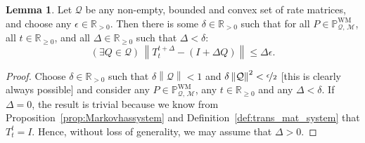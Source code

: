 \documentclass[10pt,a4paper]{paper}
\theoremstyle{definition}
\newtheorem{lemma}[theorem]{Lemma}
\newcommand{\reals}{\mathbb{R}}
\newcommand{\realspos}{\reals_{>0}}
\newcommand{\realsnonneg}{\reals_{\geq 0}}
\newcommand{\processes}{\mathbb{P}}
\newcommand{\wmprocesses}{\processes^{\mathrm{WM}}}
\newcommand{\rateset}{\mathcal{Q}}
\newcommand{\norm}[1]{\left\lVert #1 \right\rVert}
\begin{document}
\begin{lemma}\label{lemma:uniform_delta_for_convex_markov_set}
Let $\rateset$ be any non-empty, bounded and convex set of rate matrices, and choose any $\epsilon\in\realspos$. Then there is some $\delta\in\realspos$ such that for all $P\in\wmprocesses_{\rateset,\,\mathcal{M}}$, all $t\in\realsnonneg$, and all $\Delta\in\realsnonneg$ such that $\Delta<\delta$:
\begin{equation*}
(\exists Q\in\rateset)\,\norm{T_{t}^{t+\Delta} - (I+\Delta Q)} \leq \Delta\epsilon.
\end{equation*}
\end{lemma}
\begin{proof}
Choose $\delta\in\realspos$ such that $\delta\norm{\rateset}<1$ and $\delta\norm{\rateset}^2<\nicefrac{\epsilon}{2}$ [this is clearly always possible] and consider any $P\in\wmprocesses_{\rateset,\,\mathcal{M}}$, any $t\in\realsnonneg$ and any $\Delta<\delta$. If $\Delta=0$, the result is trivial because we know from Proposition~\ref{prop:Markovhassystem} and Definition~\ref{def:trans_mat_system} that $T_t^t=I$. Hence, without loss of generality, we may assume that $\Delta>0$.


\end{proof}
\end{document}
